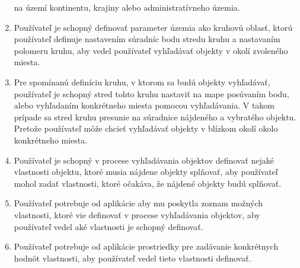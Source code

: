 \begin{enumerate}
            na území kontinentu, krajiny alebo administratívneho územia.
      \item Používateľ je schopný definovať parameter územia ako kruhovú oblasť, ktorú používateľ definuje nastavením súradníc bodu stredu kruhu a nastavaním polomeru kruhu, aby vedel používateľ
            vyhľadávať objekty v okolí zvoleného miesta.
      \item Pre spomínanú definíciu kruhu, v ktorom sa budú objekty vyhľadávať, používateľ je schopný stred tohto kruhu nastaviť na mape posúvaním bodu, alebo
            vyhľadaním konkrétneho miesta pomocou vyhľadávania. V takom prípade sa stred kruhu presunie na súradnice nájdeného a vybratého objektu. Pretože používateľ
            môže chcieť vyhľadávať objekty v blízkom okolí okolo konkrétneho miesta.
      \item Používateľ je schopný v procese vyhľadávania objektov definovať nejaké vlastnosti objektu, ktoré musia nájdene objekty splňovať, aby používateľ mohol zadať vlastnosti,
            ktoré očakáva, že nájdené objekty budú splňovať.
      \item Používateľ potrebuje od aplikácie aby mu poskytla zoznam možných vlastnosti, ktoré vie definovať v procese vyhľadávania objektov, aby používateľ vedel aké vlastnosti je schopný definovať.
      \item Používateľ potrebuje od aplikácie prostriedky pre zadávanie konkrétnych hodnôt vlastnosti, aby používateľ vedel tieto vlastnosti definovať.
\end{enumerate}


